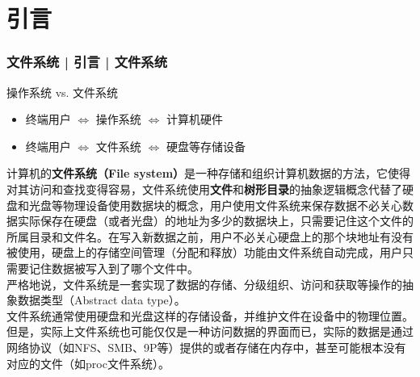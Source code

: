 \section{引言}
\begin{frame}
  \frametitle{文件系统 | 引言 | 文件系统}
\begin{block}{操作系统 vs. 文件系统}
\begin{itemize}
  \item 终端用户 $\Longleftrightarrow$ 操作系统 $\Longleftrightarrow$ 计算机硬件
  \item 终端用户 $\Longleftrightarrow$ 文件系统 $\Longleftrightarrow$ 硬盘等存储设备
\end{itemize}
\end{block}
\pause
  \footnotesize{
  计算机的\textbf{文件系统（File system）}是一种存储和组织计算机数据的方法，它使得对其访问和查找变得容易，文件系统使用\textbf{文件}和\textbf{树形目录}的抽象逻辑概念代替了硬盘和光盘等物理设备使用数据块的概念，用户使用文件系统来保存数据不必关心数据实际保存在硬盘（或者光盘）的地址为多少的数据块上，只需要记住这个文件的所属目录和文件名。在写入新数据之前，用户不必关心硬盘上的那个块地址有没有被使用，硬盘上的存储空间管理（分配和释放）功能由文件系统自动完成，用户只需要记住数据被写入到了哪个文件中。\\
  \vspace{0.1cm}
严格地说，文件系统是一套实现了数据的存储、分级组织、访问和获取等操作的抽象数据类型（Abstract data type）。\\
  \vspace{0.1cm}
文件系统通常使用硬盘和光盘这样的存储设备，并维护文件在设备中的物理位置。但是，实际上文件系统也可能仅仅是一种访问数据的界面而已，实际的数据是通过网络协议（如NFS、SMB、9P等）提供的或者存储在内存中，甚至可能根本没有对应的文件（如proc文件系统）。
}
\end{frame}

